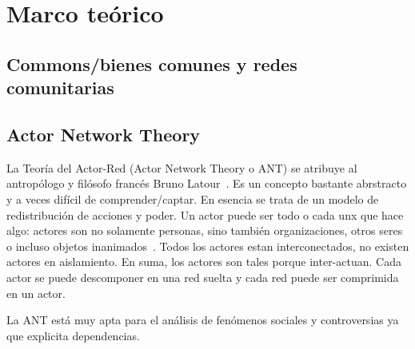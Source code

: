 \section{Marco teórico}

\subsection{Commons/bienes comunes y redes comunitarias}

\begin{comment}
## "community"

> The term “community” has played a central role in American affective politics for a long time,
> and as Cherry Schrecker (2006) argues, this thoroughly positive connotation carries, with ex-
> tremely few exceptions, through most of Anglo-Saxon sociology.

* en alemán: más ambiguo (los nacis y la "Volksgemeinschaft")
* español? ("comunidad", "comunitari@");
\end{comment}

\subsection{Actor Network Theory}

La Teoría del Actor-Red (Actor Network Theory o ANT) se atribuye al antropólogo y filósofo francés Bruno Latour~\autocite{Latour2010}.
Es un concepto bastante abrstracto y a veces difícil de comprender/captar.
En esencia se trata de un modelo de redistribución de acciones y poder.
Un actor puede ser todo o cada unx que hace algo: actores son no solamente personas, sino también organizaciones, otros seres o incluso objetos inanimados~\autocite{Venturini2010b}.
Todos los actores estan interconectados, no existen actores en aislamiento.
En suma, los actores son tales porque inter-actuan.
Cada actor se puede descomponer en una red suelta y cada red puede ser comprimida en un actor.

La ANT está muy apta para el análisis de fenómenos sociales y controversias ya que explicita dependencias.

